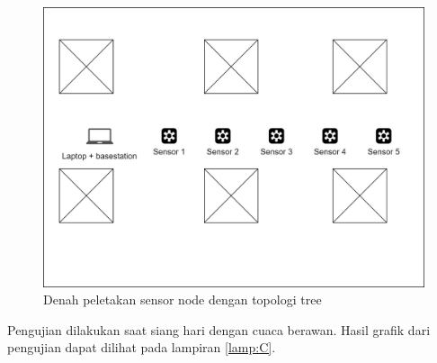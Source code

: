\begin{figure}[H] 
	\centering  
	\includegraphics[scale=0.3]{Gambar/Hasil Sensing/Pengujian-Tree Rooftop.jpg} 
	\caption[Denah peletakan sensor node dengan topologi tree]{Denah peletakan sensor node dengan topologi tree}
	\label{fig:denah_tree_rooftop} 
\end{figure}

Pengujian dilakukan saat siang hari dengan cuaca berawan. Hasil grafik dari pengujian dapat dilihat pada lampiran \ref{lamp:C}.

